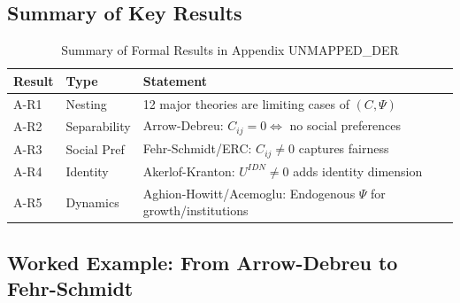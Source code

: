 

\subsection{Summary of Key Results}
\label{sec:A-results}

\begin{table}[htbp]
\centering
\caption{Summary of Formal Results in Appendix UNMAPPED_DER}
\label{tab:A-results}
\renewcommand{\arraystretch}{1.2}
\begin{tabular}{@{}llp{7cm}@{}}
\toprule
\textbf{Result} & \textbf{Type} & \textbf{Statement} \\
\midrule
A-R1 & Nesting & 12 major theories are limiting cases of $(C, \Psi)$ \\
A-R2 & Separability & Arrow-Debreu: $C_{ij} = 0 \Leftrightarrow$ no social preferences \\
A-R3 & Social Pref & Fehr-Schmidt/ERC: $C_{ij} \neq 0$ captures fairness \\
A-R4 & Identity & Akerlof-Kranton: $U^{IDN} \neq 0$ adds identity dimension \\
A-R5 & Dynamics & Aghion-Howitt/Acemoglu: Endogenous $\Psi$ for growth/institutions \\
\bottomrule
\end{tabular}
\end{table}


\subsection{Worked Example: From Arrow-Debreu to Fehr-Schmidt}
\label{sec:A-example}

